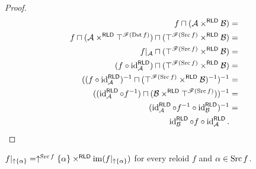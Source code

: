 \begin{proof}
~
\begin{align*}
f\sqcap(\mathcal{A}\times^{\mathsf{RLD}}\mathcal{B}) & =\\
f\sqcap(\mathcal{A}\times^{\mathsf{RLD}}\top^{\mathscr{F}(\operatorname{Dst} f)})\sqcap(\top^{\mathscr{F}(\operatorname{Src} f)}\times^{\mathsf{RLD}}\mathcal{B}) & =\\
f|_{\mathcal{A}}\sqcap(\top^{\mathscr{F}(\operatorname{Src} f)}\times^{\mathsf{RLD}}\mathcal{B}) & =\\
(f\circ\operatorname{id}_{\mathcal{A}}^{\mathsf{\mathsf{RLD}}})\sqcap(\top^{\mathscr{F}(\operatorname{Src} f)}\times^{\mathsf{RLD}}\mathcal{B}) & =\\
((f\circ\operatorname{id}_{\mathcal{A}}^{\mathsf{\mathsf{RLD}}})^{-1}\sqcap(\top^{\mathscr{F}(\operatorname{Src} f)}\times^{\mathsf{RLD}}\mathcal{B})^{-1})^{-1} & =\\
((\operatorname{id}_{\mathcal{A}}^{\mathsf{\mathsf{RLD}}}\circ f^{-1})\sqcap(\mathcal{B}\times^{\mathsf{RLD}}\top^{\mathscr{F}(\operatorname{Src} f)}))^{-1} & =\\
(\operatorname{id}_{\mathcal{A}}^{\mathsf{\mathsf{RLD}}}\circ f^{-1}\circ\operatorname{id}_{\mathcal{B}}^{\mathsf{\mathsf{RLD}}})^{-1} & =\\
\operatorname{id}_{\mathcal{B}}^{\mathsf{\mathsf{RLD}}}\circ f\circ\operatorname{id}_{\mathcal{A}}^{\mathsf{\mathsf{RLD}}}.
\end{align*}
\end{proof}
\begin{thm}
$f|_{\uparrow\{\alpha\}}=\uparrow^{\operatorname{Src} f}\{\alpha\}\times^{\mathsf{RLD}}\operatorname{im}(f|_{\uparrow\{\alpha\}})$
for every reloid $f$ and $\alpha\in\operatorname{Src} f$.\end{thm}

